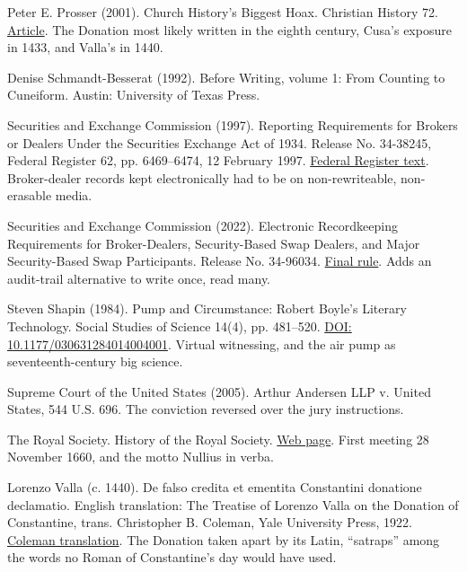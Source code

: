 \documentclass[11pt,twoside]{article}
\theoremstyle{thielethm}
\theoremstyle{thieledef}
\theoremstyle{thieledef}
\theoremstyle{thieledef}
\theoremstyle{thielethm}
\theoremstyle{thieleobs}
\theoremstyle{thielethm}
\begin{document}
\noindent Peter E. Prosser (2001). Church History's Biggest Hoax. Christian History 72. \href{https://christianhistoryinstitute.org/magazine/article/church-historys-biggest-hoax}{Article}. The Donation most likely written in the eighth century, Cusa's exposure in 1433, and Valla's in 1440.
\par\medskip

\noindent Denise Schmandt-Besserat (1992). Before Writing, volume 1: From Counting to Cuneiform. Austin: University of Texas Press.
\par\medskip

\noindent Securities and Exchange Commission (1997). Reporting Requirements for Brokers or Dealers Under the Securities Exchange Act of 1934. Release No. 34-38245, Federal Register 62, pp. 6469--6474, 12 February 1997. \href{https://www.govinfo.gov/content/pkg/FR-1997-02-12/html/97-3426.htm}{Federal Register text}. Broker-dealer records kept electronically had to be on non-rewriteable, non-erasable media.
\par\medskip

\noindent Securities and Exchange Commission (2022). Electronic Recordkeeping Requirements for Broker-Dealers, Security-Based Swap Dealers, and Major Security-Based Swap Participants. Release No. 34-96034. \href{https://www.sec.gov/rules/final/2022/34-96034.pdf}{Final rule}. Adds an audit-trail alternative to write once, read many.
\par\medskip

\noindent Steven Shapin (1984). Pump and Circumstance: Robert Boyle's Literary Technology. Social Studies of Science 14(4), pp. 481--520. \href{https://doi.org/10.1177/030631284014004001}{DOI: 10.1177/030631284014004001}. Virtual witnessing, and the air pump as seventeenth-century big science.
\par\medskip

\noindent Supreme Court of the United States (2005). Arthur Andersen LLP v. United States, 544 U.S. 696. The conviction reversed over the jury instructions.
\par\medskip

\noindent The Royal Society. History of the Royal Society. \href{https://royalsociety.org/about-us/who-we-are/history/}{Web page}. First meeting 28 November 1660, and the motto Nullius in verba.
\par\medskip

\noindent Lorenzo Valla (c. 1440). De falso credita et ementita Constantini donatione declamatio. English translation: The Treatise of Lorenzo Valla on the Donation of Constantine, trans. Christopher B. Coleman, Yale University Press, 1922. \href{https://history.hanover.edu/texts/vallaintro.html}{Coleman translation}. The Donation taken apart by its Latin, ``satraps'' among the words no Roman of Constantine's day would have used.
\par\medskip
\end{document}
